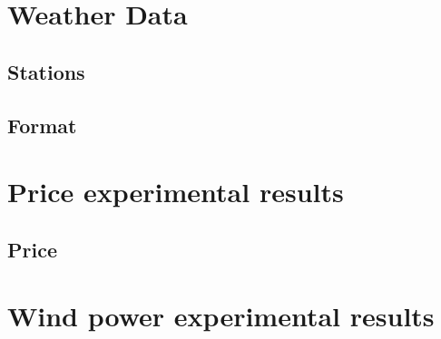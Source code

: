 \documentclass[twoside,11pt,openright]{report}
\begin{document}
\section{Weather Data}
\subsection{Stations}
\label{sec:weatherStations}

\subsection{Format} 
\label{sec:weatherDataFormat}
 
\section{Price experimental results}
\subsection{Price}
\label{sec:priceResultAppendix}
 
\section{Wind power experimental results}
\label{sec:windResultsAppendix}
 	
\end{document}
